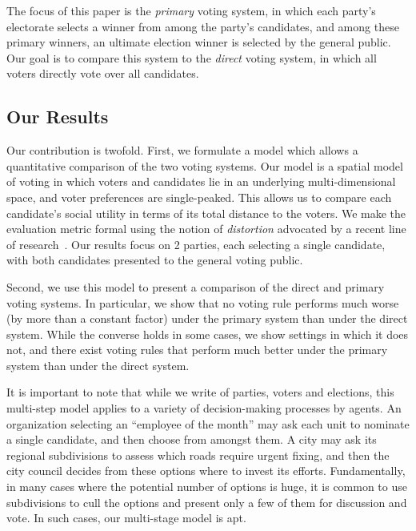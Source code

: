 \documentclass[letterpaper]{article} %
\newcommand{\kibitz}[2]{\ifnum\Comments=1{\color{#1}{#2}}\fi}
\newcommand{\ns}[1]{\kibitz{blue}{[Nisarg: #1]}}
\theoremstyle{definition}
\begin{document}

The focus of this paper is the \emph{primary} voting system, in which each party's electorate selects a winner from among the party's candidates, and among these primary winners, an ultimate election winner is selected by the general public. Our goal is to compare this system to the \emph{direct} voting system, in which all voters directly vote over all candidates. 

\subsection{Our Results} 
Our contribution is twofold. First, we formulate a model which allows a quantitative comparison of the two voting systems. Our model is a spatial model of voting in which voters and candidates lie in an underlying multi-dimensional space, and voter preferences are single-peaked. This allows us to compare each candidate's social utility in terms of its total distance to the voters. We make the evaluation metric formal using the notion of \emph{distortion} advocated by a recent line of research~\cite{PR06,BCHL+15}. Our results focus on 2 parties, each selecting a single candidate, with both candidates presented to the general voting public.

Second, we use this model to present a comparison of the direct and primary voting systems. In particular, we show that no voting rule performs much worse (by more than a constant factor) under the primary system than under the direct system. While the converse holds in some cases, we show settings in which it does not, and there exist voting rules that perform much better under the primary system than under the direct system.%

It is important to note that while we write of parties, voters and elections, this multi-step model applies to a variety of decision-making processes by agents. An organization selecting an ``employee of the month'' may ask each unit to nominate a single candidate, and then choose from amongst them. A city may ask its regional subdivisions to assess which roads require urgent fixing, and then the city council decides from these options where to invest its efforts. Fundamentally, in many cases where the potential number of options is huge, it is common to use subdivisions to cull the options and present only a few of them for discussion and vote. In such cases, our multi-stage model is apt. %
\end{document}
